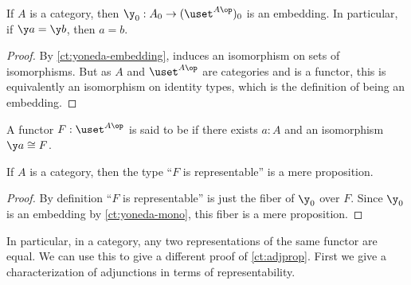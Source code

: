 \begin{cor}\label{ct:yoneda-mono}
  If $A$ is a category, then $\y_0 : A_0 \to (\uset^{A\op})_0$ is an embedding.
  In particular, if $\y a = \y b$, then $a=b$.
\end{cor}
\begin{proof}
  By \cref{ct:yoneda-embedding}, \y induces an isomorphism on sets of isomorphisms.
  But as $A$ and $\uset^{A\op}$ are categories and \y is a functor, this is equivalently an isomorphism on identity types, which is the definition of being an embedding.
\end{proof}

\begin{defn}\label{ct:representable}
  A functor $F:\uset^{A\op}$ is said to be 
  if there exists $a:A$ and an isomorphism $\y a \cong F$.
\end{defn}

\begin{thm}\label{ct:representable-prop}
  If $A$ is a category, then the type ``$F$ is representable'' is a mere proposition.
\end{thm}
\begin{proof}
  By definition ``$F$ is representable'' is just the fiber of $\y_0$ over $F$.
  Since $\y_0$ is an embedding by \cref{ct:yoneda-mono}, this fiber is a mere proposition.
\end{proof}

In particular, in a category, any two representations of the same functor are equal.
We can use this to give a different proof of \cref{ct:adjprop}.
First we give a characterization of adjunctions in terms of representability.

